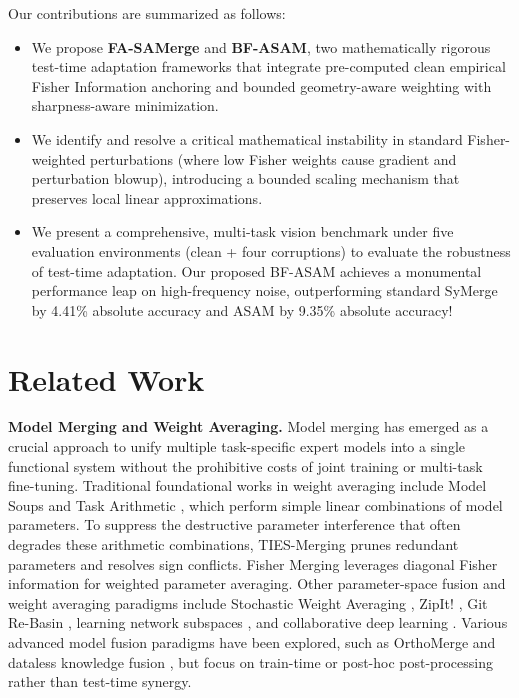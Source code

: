 \documentclass{article}
\theoremstyle{plain}
\theoremstyle{definition}
\theoremstyle{remark}
\begin{document}
Our contributions are summarized as follows:
\begin{itemize}
    \item We propose \textbf{FA-SAMerge} and \textbf{BF-ASAM}, two mathematically rigorous test-time adaptation frameworks that integrate pre-computed clean empirical Fisher Information anchoring and bounded geometry-aware weighting with sharpness-aware minimization.
    \item We identify and resolve a critical mathematical instability in standard Fisher-weighted perturbations (where low Fisher weights cause gradient and perturbation blowup), introducing a bounded scaling mechanism that preserves local linear approximations.
    \item We present a comprehensive, multi-task vision benchmark under five evaluation environments (clean + four corruptions) to evaluate the robustness of test-time adaptation. Our proposed BF-ASAM achieves a monumental performance leap on high-frequency noise, outperforming standard SyMerge by 4.41\% absolute accuracy and ASAM by 9.35\% absolute accuracy!
\end{itemize}

\section{Related Work}
\label{sec:related}
\textbf{Model Merging and Weight Averaging.} Model merging has emerged as a crucial approach to unify multiple task-specific expert models into a single functional system without the prohibitive costs of joint training or multi-task fine-tuning. Traditional foundational works in weight averaging include Model Soups \cite{Wortsman2022} and Task Arithmetic \cite{Ilharco2022}, which perform simple linear combinations of model parameters. To suppress the destructive parameter interference that often degrades these arithmetic combinations, TIES-Merging \cite{Yadav2023} prunes redundant parameters and resolves sign conflicts. Fisher Merging \cite{Matena2022} leverages diagonal Fisher information for weighted parameter averaging. Other parameter-space fusion and weight averaging paradigms include Stochastic Weight Averaging \cite{Izmailov2018}, ZipIt! \cite{Stoica2023}, Git Re-Basin \cite{Ainsworth2023}, learning network subspaces \cite{Wortsman2021}, and collaborative deep learning \cite{Choset2022}. Various advanced model fusion paradigms have been explored, such as OrthoMerge \cite{Yang2026} and dataless knowledge fusion \cite{Shen2024}, but focus on train-time or post-hoc post-processing rather than test-time synergy.
\end{document}
